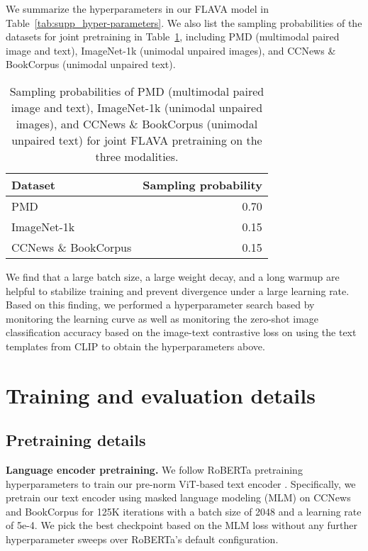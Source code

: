 \documentclass[10pt,twocolumn,letterpaper]{article}
\newcommand{\myparagraph}[1]{\vspace{0.25em}\noindent\textbf{#1}}
\begin{document}
We summarize the hyperparameters in our FLAVA model in Table~\ref{tab:supp_hyper-parameters}. We also list the sampling probabilities of the datasets for joint pretraining in Table~\ref{tab:supp_sampling_ratio}, including PMD (multimodal paired image and text), ImageNet-1k (unimodal unpaired images), and CCNews \& BookCorpus (unimodal unpaired text).

\begin{table}[t]
\small
\begin{center}
\begin{tabular}{@{}l@{}r@{}}
\toprule
\textbf{Dataset} & \textbf{Sampling probability}
\\
\midrule
PMD & 0.70 \\
ImageNet-1k & 0.15 \\
CCNews \& BookCorpus & 0.15 \\
\bottomrule
\end{tabular}
\end{center}
\vspace{-1.5em}
\caption{Sampling probabilities of PMD (multimodal paired image and text), ImageNet-1k (unimodal unpaired images), and CCNews \& BookCorpus (unimodal unpaired text) for joint FLAVA pretraining on the three modalities.}
\label{tab:supp_sampling_ratio}
\vspace{-1em}
\end{table}

We find that a large batch size, a large weight decay, and a long warmup are helpful to stabilize training and prevent divergence under a large learning rate. Based on this finding, we performed a hyperparameter search based by monitoring the learning curve as well as monitoring the zero-shot image classification accuracy based on the image-text contrastive loss on using the text templates from CLIP \cite{radford2021learning} to obtain the hyperparameters above.

\section{Training and evaluation details}
\subsection{Pretraining details}

\myparagraph{Language encoder pretraining.} We follow RoBERTa pretraining hyperparameters to train our pre-norm ViT-based text encoder \cite{liu2019roberta}. Specifically, we pretrain our text encoder using masked language modeling (MLM) \cite{devlin2018bert} on CCNews and BookCorpus for 125K iterations with a batch size of 2048 and a learning rate of 5e-4. We pick the best checkpoint based on the MLM loss without any further hyperparameter sweeps over RoBERTa's default configuration.
\end{document}
